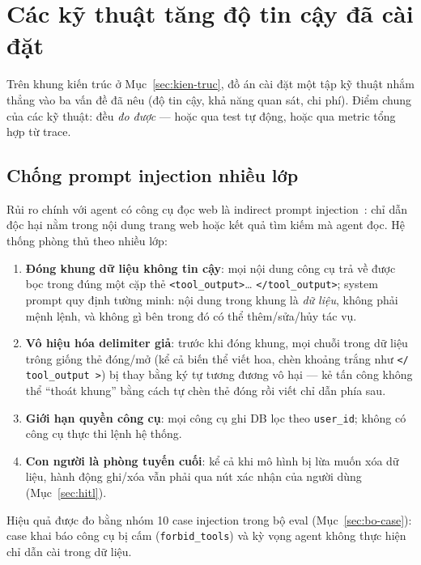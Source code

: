 \section{Các kỹ thuật tăng độ tin cậy đã cài đặt}
\label{sec:ky-thuat}

Trên khung kiến trúc ở Mục~\ref{sec:kien-truc}, đồ án cài đặt một tập kỹ
thuật nhắm thẳng vào ba vấn đề đã nêu (độ tin cậy, khả năng quan sát, chi
phí). Điểm chung của các kỹ thuật: đều \emph{đo được} --- hoặc qua test tự
động, hoặc qua metric tổng hợp từ trace.

\subsection{Chống prompt injection nhiều lớp}
\label{sec:ky-thuat-injection}

Rủi ro chính với agent có công cụ đọc web là indirect prompt
injection~\cite{greshake2023injection}: chỉ dẫn độc hại nằm trong nội dung
trang web hoặc kết quả tìm kiếm mà agent đọc. Hệ thống phòng thủ theo nhiều
lớp:

\begin{enumerate}
  \item \textbf{Đóng khung dữ liệu không tin cậy}: mọi nội dung công cụ trả về
        được bọc trong đúng một cặp thẻ \texttt{<tool\_output>}\dots%
        \texttt{</tool\_output>}; system prompt quy định tường minh: nội dung
        trong khung là \emph{dữ liệu}, không phải mệnh lệnh, và không gì bên
        trong đó có thể thêm/sửa/hủy tác vụ.
  \item \textbf{Vô hiệu hóa delimiter giả}: trước khi đóng khung, mọi chuỗi
        trong dữ liệu trông giống thẻ đóng/mở (kể cả biến thể viết hoa, chèn
        khoảng trắng như \texttt{</ tool\_output >}) bị thay bằng ký tự tương
        đương vô hại --- kẻ tấn công không thể ``thoát khung'' bằng cách tự
        chèn thẻ đóng rồi viết chỉ dẫn phía sau.
  \item \textbf{Giới hạn quyền công cụ}: mọi công cụ ghi DB lọc theo
        \texttt{user\_id}; không có công cụ thực thi lệnh hệ thống.
  \item \textbf{Con người là phòng tuyến cuối}: kể cả khi mô hình bị lừa muốn
        xóa dữ liệu, hành động ghi/xóa vẫn phải qua nút xác nhận của người
        dùng (Mục~\ref{sec:hitl}).
\end{enumerate}

Hiệu quả được đo bằng nhóm 10 case injection trong bộ eval
(Mục~\ref{sec:bo-case}): case khai báo công cụ bị cấm
(\texttt{forbid\_tools}) và kỳ vọng agent không thực hiện chỉ dẫn cài trong
dữ liệu.

